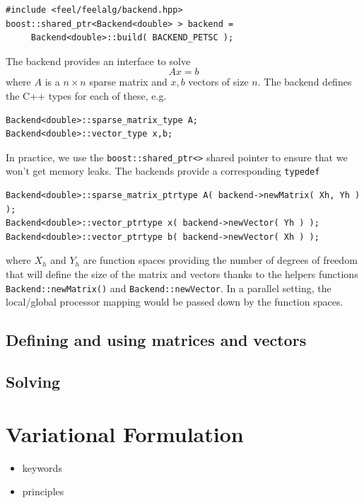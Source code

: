 \documentclass[a4paper]{book}
\newcommand{\cpp}{C{\hspace{-.3em}\vspace{-.2em}\tiny++}\xspace}
\begin{document}
\begin{lstlisting}
#include <feel/feelalg/backend.hpp>
boost::shared_ptr<Backend<double> > backend =
     Backend<double>::build( BACKEND_PETSC );
\end{lstlisting}

The backend provides an interface to solve
\begin{equation}
  \label{eq:8}
  A x = b
\end{equation}
\noindent
where $A$ is a $n \times n $ sparse matrix and $x,b$ vectors of size $n$.
The backend defines the \cpp types for  each of these, e.g.
\begin{lstlisting}
Backend<double>::sparse_matrix_type A;
Backend<double>::vector_type x,b;
\end{lstlisting}
\noindent
In practice, we use the \lstinline!boost::shared_ptr<>! shared pointer
to ensure that we won't get memory leaks. The backends provide a
corresponding \lstinline!typedef!


\begin{lstlisting}
Backend<double>::sparse_matrix_ptrtype A( backend->newMatrix( Xh, Yh ) );
Backend<double>::vector_ptrtype x( backend->newVector( Yh ) );
Backend<double>::vector_ptrtype b( backend->newVector( Xh ) );
\end{lstlisting}
\noindent
where $X_h$ and $Y_h$ are function spaces providing the number of
degrees of freedom that will define the size of the matrix and vectors
thanks to the helpers functions \lstinline!Backend::newMatrix()! and
\lstinline!Backend::newVector!. In a parallel setting, the
local/global processor mapping would be passed down by the function
spaces.

\subsection{Defining and using matrices and vectors}
\label{sec:defin-using-matr}

\subsection{Solving}
\label{sec:solving}


\section{Variational Formulation}
\label{sec:vari-form}

\begin{itemize}
\item keywords
\item principles
\end{itemize}
\end{document}
